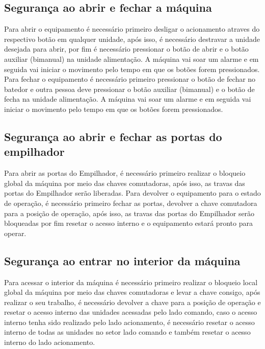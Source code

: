 \fi
\ifmachineTypeIcv

\subsection{Segurança ao abrir e fechar a máquina}

Para abrir o equipamento é necessário primeiro desligar o acionamento atraves do respectivo botão em qualquer unidade, após isso, é necessário destravar a unidade 
desejada para abrir, por fim é necessário pressionar o botão de abrir e o botão auxiliar (bimanual) na unidade alimentação. A máquina vai soar um alarme e em seguida
vai iniciar o movimento pelo tempo em que os botões forem pressionados. Para fechar o equipamento é necessário primeiro pressionar o botão de fechar no batedor e outra
pessoa deve pressionar o botão auxiliar (bimanual) e o botão de fecha na unidade alimentação. A máquina vai soar um alarme e em seguida vai iniciar o movimento pelo tempo 
em que os botões forem pressionados.

\subsection{Segurança ao abrir e fechar as portas do empilhador}

Para abrir as portas do Empilhador, é necessário primeiro realizar o bloqueio global da máquina por meio das chaves comutadoras, após isso, as travas das portas do
Empilhador serão liberadas. Para devolver o equipamento para o estado de operação, é necessário primeiro fechar as portas, devolver a chave comutadora para a posição de 
operação, após isso, as travas das portas do Empilhador serão bloqueadas por fim resetar o acesso interno e o equipamento estará pronto para operar.

\newpage
\thispagestyle{fancy}
\vspace*{40 pt}

\fi

\subsection{Segurança ao entrar no interior da máquina}

Para acessar o interior da máquina é necessário primeiro realizar o bloqueio \ifmachineTypeFlexo local \fi \ifmachineTypeIcv global \fi da máquina por meio das chaves comutadoras e levar a chave consigo, após realizar o
seu trabalho, é necessário devolver a chave para a posição de operação e resetar o acesso interno das unidades acessadas pelo lado comando, caso o acesso interno tenha
sido realizado pelo lado acionamento, é necessário resetar o acesso interno de todas as unidades no setor lado comando e também resetar o acesso interno do lado acionamento.

